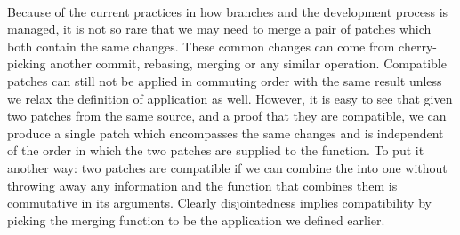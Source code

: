 \documentclass[11pt, titlepage]{article}
\begin{document}
\\
Because of the current practices in how branches and the development process is managed, it is not so rare that we may need to merge a pair of patches which both contain the same changes. These common changes can come from cherry-picking another commit, rebasing, merging or any similar operation. Compatible patches can still not be applied in commuting order with the same result unless we relax the definition of application as well. However, it is easy to see that given two patches from the same source, and a proof that they are compatible, we can produce a single patch which encompasses the same changes and is independent of the order in which the two patches are supplied to the function. To put it another way: two patches are compatible if we can combine the into one without throwing away any information and the function that combines them is commutative in its arguments.
Clearly disjointedness implies compatibility by picking the merging function to be the application we defined earlier.
\end{document}

